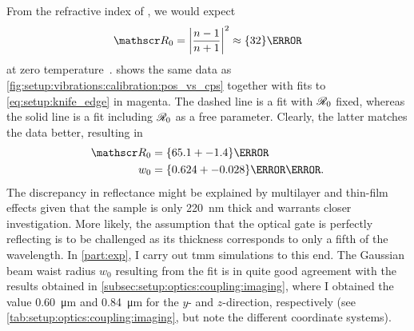 From the refractive index of , we would expect
\begin{equation}
    \reflectance_0 = \abs{\frac{n-1}{n+1}}^2 \approx \qty{32}{\percent}
\end{equation}
at zero temperature~\cite{Talghader1995}.
 shows the same data as \cref{fig:setup:vibrations:calibration:pos_vs_cps} together with fits to \cref{eq:setup:knife_edge} in magenta.
The dashed line is a fit with $\mathscr{R}_0$ fixed, whereas the solid line is a fit including $\mathscr{R}_0$ as a free parameter.
Clearly, the latter matches the data better, resulting in
\begin{align}
    \reflectance_0 &= \qty{65.1+-1.4}{\percent} \\
    w_0 &= \qty{0.624+-0.028}{\micro\meter}.
\end{align}
The discrepancy in reflectance might be explained by multilayer and thin-film effects given that the sample is only \qty{220}{\nano\meter} thick and warrants closer investigation.
More likely, the assumption that the  optical gate is perfectly reflecting is to be challenged as its thickness corresponds to only a fifth of the wavelength.
In \cref{part:exp}, I carry out \gls{tmm} simulations to this end.
The Gaussian beam waist radius $w_0$ resulting from the fit is in quite good agreement with the results obtained in \cref{subsec:setup:optics:coupling:imaging}, where I obtained the value \qty{0.60}{\micro\meter} and \qty{0.84}{\micro\meter} for the $y$- and $z$-direction, respectively (see \cref{tab:setup:optics:coupling:imaging}, but note the different coordinate systems).
